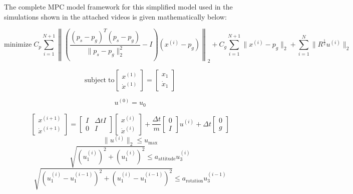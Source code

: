 The complete MPC model framework for this simplified model used in the simulations shown in the attached videos is given mathematically below:

\begin{equation} \label{eq:mpc_obj}
\mathrm{minimize\;} 
 C_p\sum_{i=1}^{N+1}\left\|\left(\frac{(p_s-p_g)^T(p_s-p_g)}{\|p_s-p_g\|_2^2}-I\right)(x^{(i)}-p_g)\right\|_2 + C_g\sum_{i=1}^{N+1}\|x^{(i)}-p_g\|_2 + \sum_{i=1}^{N}\|R^\frac{1}{2}u^{(i)}\|_2
\end{equation}

\begin{equation}
\mathrm{subject \;to}
\begin{bmatrix}
x^{(1)} \\ \dot{x}^{(1)}
\end{bmatrix}
 = 
\begin{bmatrix}
x_1 \\ \dot{x}_1
\end{bmatrix}
\end{equation}

\begin{equation}
u^{(0)} = u_0
\end{equation}

\begin{equation} \label{eq:mpc_dyn_constr}
\begin{bmatrix}
x^{(i+1)} \\ \dot{x}^{(i+1)}
\end{bmatrix}
=
\begin{bmatrix}
I & \Delta t I \\ 0 & I
\end{bmatrix}
\begin{bmatrix}
x^{(i)} \\ \dot{x}^{(i)}
\end{bmatrix}
+ \frac{\Delta t}{m}
\begin{bmatrix}
0 \\ I
\end{bmatrix}
u^{(i)}
+ \Delta t
\begin{bmatrix}
0 \\ g
\end{bmatrix}
\end{equation}
\begin{equation} \label{eq:mpc_umax}
\|u^{(i)}\|_2 \leq u_\mathrm{max}
\end{equation}
\begin{equation} \label{eq:mpc_u_constr}
\sqrt{(u_1^{(i)})^2 + (u_1^{(i)})^2} \leq a_\mathrm{attitude} u_3^{(i)}
\end{equation}
\begin{equation} \label{eq:mpc_du_constr}
\sqrt{(u_1^{(i)} - u_1^{(i-1)})^2 + (u_1^{(i)} - u_1^{(i-1)})^2} \leq a_\mathrm{rotation} u_3^{(i-1)}
\end{equation}

